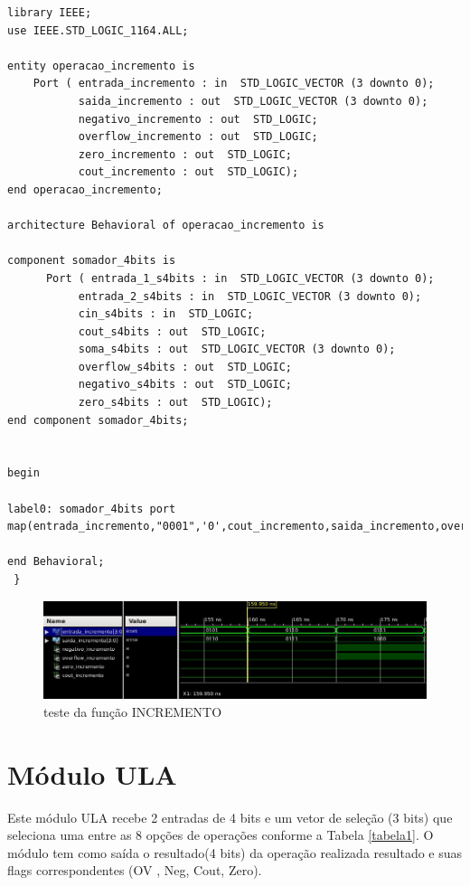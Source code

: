 \documentclass[a4paper,12pt,twoside]{article}
\begin{document}
\begin{lstlisting}
library IEEE;
use IEEE.STD_LOGIC_1164.ALL;

entity operacao_incremento is
    Port ( entrada_incremento : in  STD_LOGIC_VECTOR (3 downto 0);
           saida_incremento : out  STD_LOGIC_VECTOR (3 downto 0);
           negativo_incremento : out  STD_LOGIC;
           overflow_incremento : out  STD_LOGIC;
           zero_incremento : out  STD_LOGIC;
           cout_incremento : out  STD_LOGIC);
end operacao_incremento;

architecture Behavioral of operacao_incremento is

component somador_4bits is
      Port ( entrada_1_s4bits : in  STD_LOGIC_VECTOR (3 downto 0);
           entrada_2_s4bits : in  STD_LOGIC_VECTOR (3 downto 0);
           cin_s4bits : in  STD_LOGIC;
           cout_s4bits : out  STD_LOGIC;
           soma_s4bits : out  STD_LOGIC_VECTOR (3 downto 0);
           overflow_s4bits : out  STD_LOGIC;
           negativo_s4bits : out  STD_LOGIC;
           zero_s4bits : out  STD_LOGIC);
end component somador_4bits;


begin

label0: somador_4bits port map(entrada_incremento,"0001",'0',cout_incremento,saida_incremento,overflow_incremento,negativo_incremento,zero_incremento);

end Behavioral;
 } \end{lstlisting}
 
    \begin{figure}[H]
\centering
\includegraphics[scale=0.7]{testes/incremento.jpeg}
\caption{teste da função INCREMENTO}
\label{fig:diagrama}
\end{figure}

\section{Módulo ULA}
    Este módulo ULA recebe 2 entradas de 4 bits e um vetor de seleção (3 bits) que seleciona uma  entre as 8 opções de operações conforme a Tabela \ref{tabela1}.
    O módulo tem como saída o resultado(4 bits) da operação realizada resultado e suas flags correspondentes (OV , Neg, Cout, Zero).
    
\end{document}
